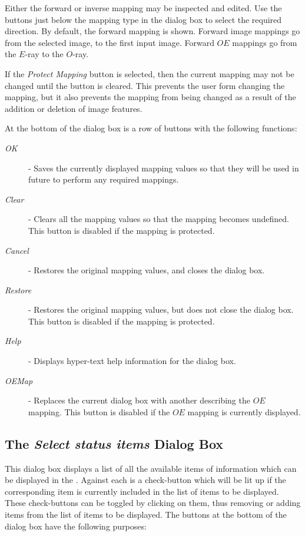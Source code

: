 \documentclass[11pt,nolof]{starlink}
\providecommand{\mylabel}[1] {\xlabel{#1}\label{#1}}
\begin{document}
Either the forward or inverse mapping may be inspected and edited. Use
the buttons just below the mapping type in the dialog box to select the
required direction. By default, the forward mapping is shown. Forward
image mappings go from the selected image, to the first input image.
Forward $OE$ mappings go from the $E$-ray to the $O$-ray.

If the \emph{Protect Mapping} button is selected, then the current mapping
may not be changed until the button is cleared. This prevents the user
form changing the mapping, but it also prevents the mapping from being
changed as a result of the addition or deletion of image features.

At the bottom of the dialog box is a row of buttons with the following
functions:

\begin{description}
\item [\emph{OK}] - Saves the currently displayed mapping values so that
they will be used in future to perform any required mappings.
\item [\emph{Clear}] - Clears all the mapping values so that the mapping
becomes undefined. This button is disabled if the mapping is protected.
\item [\emph{Cancel}] - Restores the original mapping values, and closes
the dialog box.
\item [\emph{Restore}] - Restores the original mapping values, but does not
close the dialog box. This button is disabled if the mapping is protected.
\item [\emph{Help}] - Displays hyper-text help information for the dialog
box.
\item [\emph{OEMap}] - Replaces the current dialog box with another
describing the $OE$ mapping. This button is disabled if the $OE$ mapping
is currently displayed.
\end{description}

\subsection {\mylabel{POLKA_STATUS_ITEMS_DIALOG}The \emph{Select status items} Dialog Box}
This dialog box displays a list of all the available items of information
which can be displayed in the .
Against each is a check-button which will be lit up if the corresponding
item is currently included in the list of items to be displayed. These
check-buttons can be toggled by clicking on them, thus removing or adding
items from the list of items to be displayed. The buttons at the bottom
of the dialog box have the following purposes:
\end{document}
